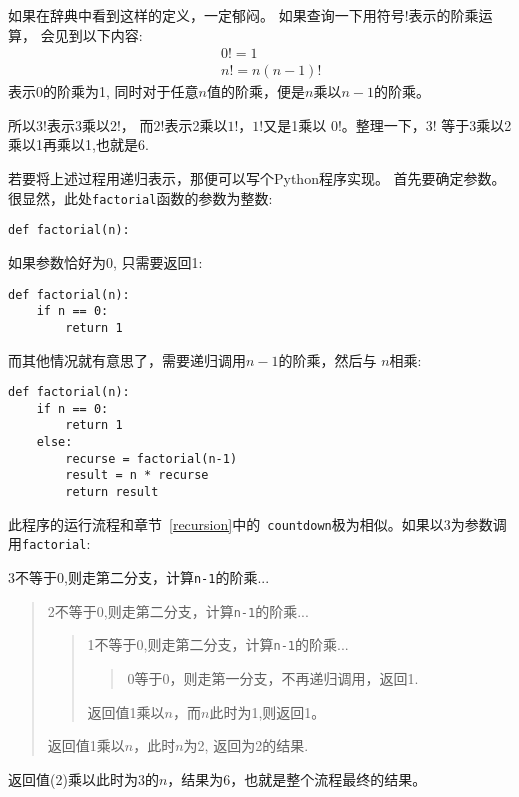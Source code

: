 \documentclass[10pt]{book}
\begin{document}
如果在辞典中看到这样的定义，一定郁闷。
如果查询一下用符号$!$表示的阶乘运算，
会见到以下内容:
%
\begin{eqnarray*}
&&  0! = 1 \\
&&  n! = n (n-1)!
\end{eqnarray*}
%
表示0的阶乘为1, 同时对于任意$n$值的阶乘，便是$n$乘以$n-1$的阶乘。

所以$3!$表示3乘以$2!$， 而$2!$表示2乘以$1!$，$1!$又是1乘以
$0!$。整理一下，$3!$ 等于3乘以2乘以1再乘以1,也就是6.

若要将上述过程用递归表示，那便可以写个Python程序实现。
首先要确定参数。很显然，此处{\tt factorial}函数的参数为整数:

\begin{verbatim}
def factorial(n):
\end{verbatim}
%
如果参数恰好为0, 只需要返回1:

\begin{verbatim}
def factorial(n):
    if n == 0:
        return 1
\end{verbatim}
%
而其他情况就有意思了，需要递归调用$n-1$的阶乘，然后与
$n$相乘:

\begin{verbatim}
def factorial(n):
    if n == 0:
        return 1
    else:
        recurse = factorial(n-1)
        result = n * recurse
        return result
\end{verbatim}
%
此程序的运行流程和章节~\ref{recursion}中的{\tt
countdown}极为相似。如果以3为参数调用{\tt factorial}:

3不等于0,则走第二分支，计算{\tt n-1}的阶乘...

\begin{quote}
2不等于0,则走第二分支，计算{\tt n-1}的阶乘...


  \begin{quote}
 1不等于0,则走第二分支，计算{\tt n-1}的阶乘...


    \begin{quote}
   0等于0，则走第一分支，不再递归调用，返回1.
    \end{quote}

  返回值1乘以$n$，而$n$此时为1,则返回1。
  \end{quote}

返回值1乘以$n$，此时$n$为2, 返回为2的结果.
\end{quote}

返回值(2)乘以此时为3的$n$，结果为6，也就是整个流程最终的结果。
\end{document}
